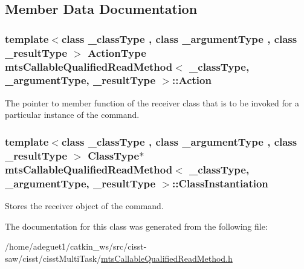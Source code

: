 \subsection{Member Data Documentation}
\hypertarget{classmts_callable_qualified_read_method_a50eaa90d9c1fb7ffa80933c21869c1b8}{
\subsubsection[{Action}]{\setlength{\rightskip}{0pt plus 5cm}template$<$class \-\_\-class\-Type , class \-\_\-argument\-Type , class \-\_\-result\-Type $>$ {\bf Action\-Type} {\bf mts\-Callable\-Qualified\-Read\-Method}$<$ \-\_\-class\-Type, \-\_\-argument\-Type, \-\_\-result\-Type $>$\-::Action\hspace{0.3cm}{\ttfamily [protected]}}}\label{classmts_callable_qualified_read_method_a50eaa90d9c1fb7ffa80933c21869c1b8}
The pointer to member function of the receiver class that is to be invoked for a particular instance of the command. \hypertarget{classmts_callable_qualified_read_method_ae3b6667da77471acabf410afa3a541d1}{
\subsubsection[{Class\-Instantiation}]{\setlength{\rightskip}{0pt plus 5cm}template$<$class \-\_\-class\-Type , class \-\_\-argument\-Type , class \-\_\-result\-Type $>$ {\bf Class\-Type}$\ast$ {\bf mts\-Callable\-Qualified\-Read\-Method}$<$ \-\_\-class\-Type, \-\_\-argument\-Type, \-\_\-result\-Type $>$\-::Class\-Instantiation\hspace{0.3cm}{\ttfamily [protected]}}}\label{classmts_callable_qualified_read_method_ae3b6667da77471acabf410afa3a541d1}
Stores the receiver object of the command. 

The documentation for this class was generated from the following file\-:\begin{DoxyCompactItemize}
\item 
/home/adeguet1/catkin\-\_\-ws/src/cisst-\/saw/cisst/cisst\-Multi\-Task/\hyperlink{mts_callable_qualified_read_method_8h}{mts\-Callable\-Qualified\-Read\-Method.\-h}\end{DoxyCompactItemize}
